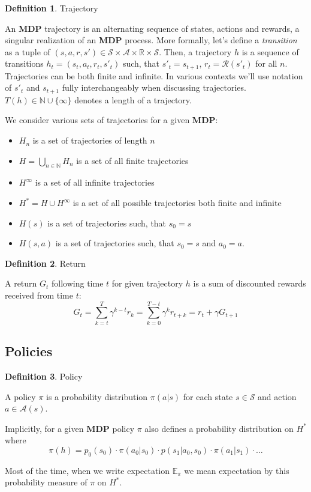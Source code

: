 \documentclass[10pt]{article}
\numberwithin{equation}{subsection}
\newcommand{\MS}{\ensuremath{\mathcal{S}}}
\newcommand{\MA}{\ensuremath{\mathcal{A}}}
\newcommand{\Mpz}{\ensuremath{p_0}}
\newcommand{\MR}{\ensuremath{\mathcal{R}}}
\newcommand{\R}{\ensuremath{\mathbb{R}}}
\newcommand{\N}{\ensuremath{\mathbb{N}}}
\newcommand{\E}{\ensuremath{\mathbb{E}}}
\newcommand{\mdp}{\textbf{MDP}\xspace}
\newcommand{\mpi}{\ensuremath{\pi}\xspace}
\theoremstyle{plain}
\theoremstyle{definition}
\newtheorem{definition}{Definition}[subsection]
\begin{document}
\begin{definition}{Trajectory}

An \mdp trajectory is an alternating sequence of states, actions and rewards, a singular realization of an \mdp process.
More formally, let's define a \emph{transition} as a tuple of 
$(s, a, r, s') \in \MS \times \MA \times \R \times \MS$. Then, a trajectory $h$ is a sequence of 
transitions $h_t = (s_t, a_t, r_t, s'_t)$ such, that $s'_t = s_{t+1}$, $r_t = \MR(s'_t)$
for all $n$. Trajectories can be 
both finite and infinite. In various contexts we'll use notation of $s'_t$ and $s_{t+1}$ fully interchangeably
when discussing trajectories. $T(h) \in \N \cup \{\infty\}$ denotes a length of a trajectory.

We consider various sets of trajectories for a given \mdp:

\begin{itemize}
\item $H_n$ is a set of trajectories of length $n$
\item $H = \bigcup_{n \in \N} H_n$ is a set of all finite trajectories
\item $H^\infty$ is a set of all infinite trajectories
\item $H^* = H \cup H^\infty$ is a set of all possible trajectories both finite and infinite
\item $H(s)$ is a set of trajectories such, that $s_0 = s$
\item $H(s, a)$ is a set of trajectories such, that $s_0 = s$ and $a_0 = a$.
\end{itemize}
\end{definition}

\begin{definition}{Return}

A return $G_t$ following time $t$ for given trajectory $h$ is a sum of discounted rewards 
received from time $t$:
$$
G_t = \sum_{k = t }^{T} \gamma^{k-t} r_k = \sum_{k=0}^{T - t} \gamma^k r_{t + k} = r_t + \gamma G_{t+1}
$$
\end{definition}


\subsection{Policies}

\begin{definition}{Policy} 

A policy \mpi is a probability distribution $\mpi(a | s)$ for each state $s \in \MS$ and 
action $a \in \MA(s)$.

Implicitly, for a given \mdp policy \mpi also defines a probability distribution on $H^*$
where 
$$
\mpi(h) = \Mpz(s_0) \cdot \mpi(a_0 | s_0) \cdot p(s_1 | a_0, s_0) \cdot \mpi(a_1 | s_1) \cdot \ldots
$$

Most of the time, when we write expectation $\E_\mpi$ we mean expectation by this probability measure
of \mpi on $H^*$.
\end{definition}
\end{document}
